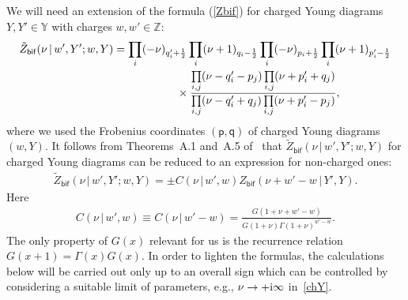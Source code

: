 \documentclass[pdftex]{sigma}
\numberwithin{equation}{section}
\begin{document}
We will need an extension of the formula (\ref{Zbif}) for charged Young diagrams $Y,Y'\in\mathbb Y$ with charges $w,w'\in\mathbb{Z}$:
\begin{gather*}%
\tilde Z_{\mathsf{bif}}(\nu\,|\,w',Y';w,Y)= \prod_i(-\nu)_{q_i'+\frac12} \prod_i
(\nu+1)_{q_i-\frac12} \prod_i(-\nu)_{p_i+\frac12} \prod_i(\nu+1)_{p_i'-\frac12} \\
\hphantom{\tilde Z_{\mathsf{bif}}(\nu\,|\,w',Y';w,Y)=}{} \times \frac{\prod\limits_{i,j}(\nu-q_i'-p_j)\prod\limits_{i,j}(\nu+p_i'+q_j)}{
\prod\limits_{i,j}(\nu-q_i'+q_j)\prod\limits_{i,j}(\nu+p_i'-p_j)},
\end{gather*}
where we used the Frobenius coordinates $({\mathsf p},{\mathsf q})$ of charged Young diagrams $(w,Y)$. It follows from Theorems~A.1 and~A.5 of~\cite{GL16} that $ \tilde Z_{\mathsf{bif}}(\nu\,|\,w',Y';w,Y)$ for charged Young diagrams can be reduced to an expression for non-charged ones:
\begin{gather}\label{chY}
\tilde Z_{\mathsf{bif}}(\nu\,|\,w',Y';w,Y)={ \pm }C(\nu\,|\,w',w) Z_{\mathsf{bif}}(\nu+w'-w\,|\,Y',Y).
\end{gather}
Here
\begin{gather*}
C(\nu\,|\,w',w)\equiv C(\nu\,|\,w'-w)=\frac{G(1+\nu+w'-w)}{G(1+\nu)\Gamma(1+\nu)^{w'-w}}.
\end{gather*}
The only property of $G(x)$ relevant for us is the recurrence relation $G(x+1)=\Gamma(x) G(x)$. In order to lighten the formulas, the calculations below will be carried out only up to an overall sign which can be controlled by considering a suitable limit of parameters, e.g., $\nu\to +{\rm i}\infty$ in~\eqref{chY}.
\end{document}
